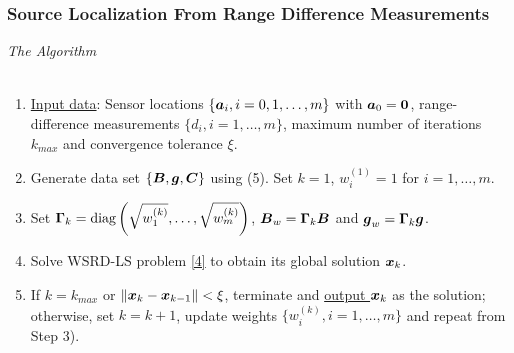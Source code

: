 
\begin{frame}
\frametitle{Source Localization From Range Difference Measurements}
{\large \textit{The Algorithm}} \\~\\
\normalsize
\begin{enumerate}
\item %
\underline{Input data}: Sensor locations $\{\mbox{\boldmath$a$}_i, i=0, 1,\ldots,m\}$ with $\mbox{\boldmath$a$}_0=\mbox{\boldmath{$0$}}$, range-difference measurements $\{d_i, i = 1,\ldots,m\}$, maximum number of iterations $k_{max}$ and convergence tolerance $\xi$.
\item %
Generate data set $\{\mbox{\boldmath$B$}, \mbox{\boldmath$g$}, \mbox{\boldmath$C$}\}$ using (5). Set $k=1$, $w_i^{(1)}=1$ for $i=1,\ldots,m.$
\item %
Set $\mbox{\boldmath{$\Gamma$}}_k=\mbox{diag}\left(\sqrt{w_1^{(k)}},\ldots,\sqrt{w_m^{(k)}}\right)$, $\mbox{\boldmath$B$}_w=\mbox{\boldmath{$\Gamma$}}_k\mbox{\boldmath$B$}$ and $\mbox{\boldmath$g$}_w=\mbox{\boldmath{$\Gamma$}}_k\mbox{\boldmath$g$}$.
\item %
Solve WSRD-LS problem \eqref{4} to obtain its global solution $\mbox{\boldmath$x$}_k$.
\item %
If $k=k_{max}$ or $\|\mbox{\boldmath$x$}_k-\mbox{\boldmath$x$}_{k-1}\|<\xi$, terminate and \underline{output $\mbox{\boldmath$x$}_k$} as the solution; otherwise, set $k=k+1$, update weights $\{w_i^{(k)}, i=1,\ldots,m\}$ and repeat from Step 3).
\end{enumerate}
\end{frame}

